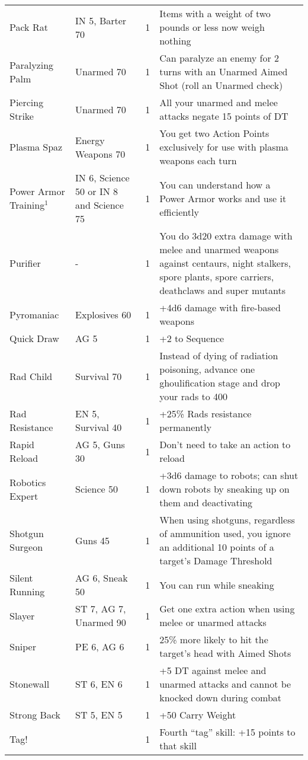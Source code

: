 \begin{longtable}{|p{3.3cm}|p{3.1cm}|p{1.2cm}|p{8.4cm}|}
Pack Rat & IN 5, Barter 70 & 1 & Items with a weight of two pounds or less now weigh nothing \\
Paralyzing Palm & Unarmed 70 & 1 & Can paralyze an enemy for 2 turns with an Unarmed Aimed Shot (roll an Unarmed check) \\
Piercing Strike & Unarmed 70 & 1 & All your unarmed and melee attacks negate 15 points of DT \\
Plasma Spaz & Energy Weapons 70 & 1 & You get two Action Points exclusively for use with plasma weapons each turn \\
Power Armor Training$^1$ & IN 6, Science 50 or IN 8 and Science 75 & 1 & You can understand how a Power Armor works and use it efficiently \\
Purifier & - & 1 & You do 3d20 extra damage with melee and unarmed weapons against centaurs, night stalkers, spore plants, spore carriers, deathclaws and super mutants \\
Pyromaniac & Explosives 60 & 1 & +4d6 damage with fire-based weapons \\
Quick Draw & AG 5 & 1 & +2 to Sequence \\
Rad Child & Survival 70 & 1 & Instead of dying of radiation poisoning, advance one ghoulification stage and drop your rads to 400 \\
Rad Resistance & EN 5, Survival 40 & 1 & +25\% Rads resistance permanently \\
Rapid Reload & AG 5, Guns 30 & 1 & Don’t need to take an action to reload \\
Robotics Expert & Science 50 & 1 & +3d6 damage to robots; can shut down robots by sneaking up on them and deactivating \\
Shotgun Surgeon & Guns 45 & 1 & When using shotguns, regardless of ammunition used, you ignore an additional 10 points of a target's Damage Threshold \\
Silent Running & AG 6, Sneak 50 & 1 & You can run while sneaking \\
Slayer & ST 7, AG 7, Unarmed 90 & 1 & Get one extra action when using melee or unarmed attacks \\
Sniper & PE 6, AG 6 & 1 & 25\% more likely to hit the target's head with Aimed Shots \\
Stonewall & ST 6, EN 6 & 1 & +5 DT against melee and unarmed attacks and cannot be knocked down during combat \\
Strong Back & ST 5, EN 5 & 1 & +50 Carry Weight \\
Tag! & & 1 & Fourth ``tag'' skill: +15 points to that skill \\

\end{longtable}
